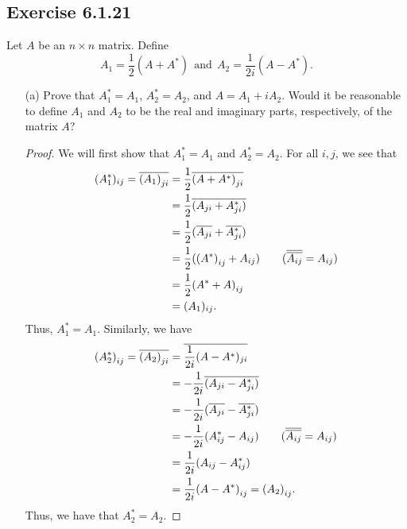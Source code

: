 \subsection*{Exercise 6.1.21} Let \( A  \) be an \( n \times n  \) matrix. Define
\[  {A}_{1} = \frac{ 1 }{ 2 }  (A + A^{*}) \ \ \text{and} \ \ {A}_{2} = \frac{ 1 }{ 2i }  (A - A^{*}). \]
\begin{enumerate}
    \item[(a)] Prove that \( {A}_{1}^{*} = {A}_{1} \), \( {A}_{2}^{*} = {A}_{2} \), and \( A = {A}_{1} + i {A}_{2} \). Would it be reasonable to define \( {A}_{1}  \) and \( {A}_{2}  \) to be the real and imaginary parts, respectively, of the matrix \( A  \)?
        \begin{proof}
        We will first show that \( {A}_{1}^{*} = {A}_{1} \) and \( {A}_{2}^{*} = {A}_{2} \). For all \( i , j \), we see that
        \begin{align*}
            ({A}_{1}^{*})_{ij} = \overline{{({A}_{1})}_{ji}} &= \frac{ 1 }{ 2 }  \overline{{(A + A^{*})}_{ji}}  \\
                                                             &= \frac{ 1 }{ 2 }  \overline{ ( {A}_{ji} + A_{ji}^{*} ) } \\
                                                             &= \frac{ 1 }{ 2 }  (\overline{{A}_{ji}} + \overline{{A}_{ji}^{*}} ) \\
                                                             &= \frac{ 1 }{ 2 }  ({(A^{*})}_{ij} + {A}_{ij}) \tag{\( \overline{\overline{{A}_{ij} }} = {A}_{ij} \)} \\
                                                             &= \frac{ 1 }{ 2 }  {(A^{*} + A )}_{ij} \\
                                                             &= ({A}_{1})_{ij}.
        \end{align*}
        Thus, \( {A}_{1}^{*} = {A}_{1} \). Similarly, we have
        \begin{align*}
            {({A}_{2}^{*})}_{ij} = \overline{{({A}_{2})}_{ji} } &= \overline{\frac{ 1 }{ 2i } (A - A^{*})_{ji}}  \\
                                                                &= - \frac{ 1 }{ 2i   } \overline{({A}_{ji} - {A}_{ji}^{*})} \\
                                                                &= - \frac{ 1 }{ 2i }  (\overline{{A}_{ji}} - \overline{{A}_{ji}^{*}}) \\ 
                                                                &= - \frac{1  }{ 2i } ( {A}_{ij}^{*} - {A}_{ij} ) \tag{\( \overline{\overline{{A}_{ij} }} = {A}_{ij} \)} \\
                                                                &= \frac{ 1 }{ 2i }  ({A}_{ij} - {A}_{ij}^{*}) \\
                                                                &= \frac{ 1 }{ 2i } {(A - A^{*})}_{ij} = {({A}_{2})}_{ij}.
        \end{align*}
        Thus, we have that \( {A}_{2}^{*} = {A}_{2} \).


\end{proof}
\end{enumerate}

